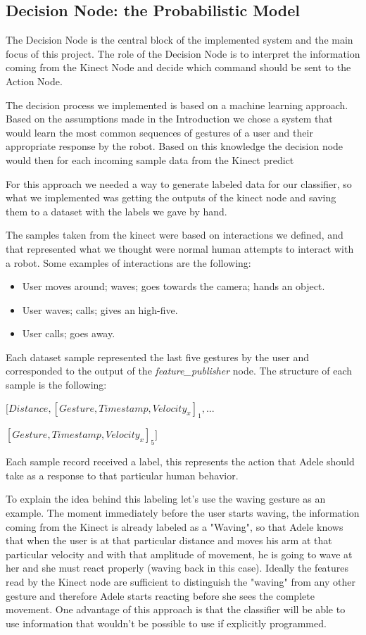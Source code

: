 \subsection{Decision Node: the Probabilistic Model}
The Decision Node is the central block of the implemented system and the main focus of this project. The role of the Decision Node is to interpret the information coming from the Kinect Node and decide which command should be sent to the Action Node.

The decision process we implemented is based on a machine learning approach. Based on the assumptions made in the Introduction we chose a system that would learn the most common sequences of gestures of a user and their appropriate response by the robot. Based on this knowledge the decision node would then for each incoming sample data from the Kinect predict  



For this approach we needed a way to generate labeled data for our classifier, so what we implemented was getting the outputs of the kinect node and saving them to a dataset with the labels we gave by hand.

The samples taken from the kinect were based on interactions we defined, and that represented what we thought were normal human attempts to interact with a robot. Some examples of interactions are the following:

\begin{itemize}
\item User moves around; waves; goes towards the camera; hands an object.
\item User waves; calls; gives an high-five.
\item User calls; goes away.
\end{itemize}

Each dataset sample represented the last five gestures by the user and corresponded to the output of the \textit{feature\_publisher} node. The structure of each sample is the following:

\vspace*{4pt}
$\Big[Distance, [Gesture, Timestamp, Velocity_x]_1,...$

$[Gesture, Timestamp, Velocity_x]_5\Big]$
\vspace*{4pt}

Each sample record received a label, this represents the action that Adele should take as a response to that particular human behavior.

To explain the idea behind this labeling let's use the waving gesture as an example. The moment immediately before the user starts waving, the information coming from the Kinect is already labeled as a "Waving", so that Adele knows that when the user is at that particular distance and moves his arm at that particular velocity and with that amplitude of movement, he is going to wave at her and she must react properly (waving back in this case). Ideally the features read by the Kinect node are sufficient to distinguish the "waving" from any other gesture and therefore Adele starts reacting before she sees the complete movement. One advantage of this approach is that the classifier will be able to use information that wouldn't be possible to use if explicitly programmed.	

